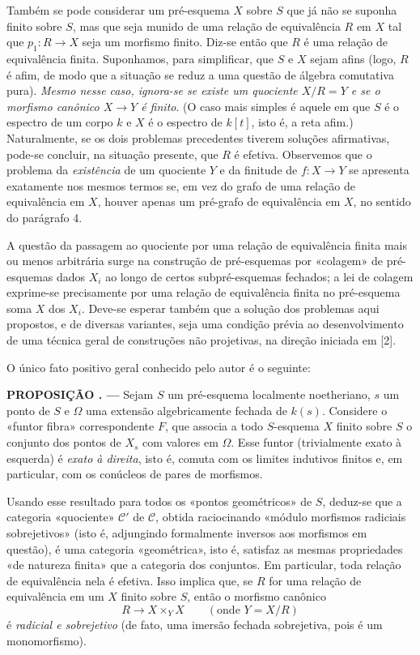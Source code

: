 \documentclass[11pt,twoside,openany]{book}
\numberwithin{equation}{section}
\newcommand{\src}[1]{%
  \phantomsection\hypertarget{src:#1}{}%
  \marginpar{\raggedleft\footnotesize\sffamily #1}%
}
\theoremstyle{plain}
\theoremstyle{definition}
\theoremstyle{remark}
\newcommand{\result}[2]{%
  \par\medskip\noindent\textbf{#1%
  \if\relax\detokenize{#2}\relax\else\space#2\fi. ---}\enspace
}
\newcommand{\FgaUnitKey}{frontmatter}
\renewcommand{\src}[1]{%
  \phantomsection\hypertarget{src:\FgaUnitKey:#1}{}%
  \marginpar{\raggedleft\footnotesize\sffamily #1}%
}
\begin{document}
Também se pode considerar um pré-esquema $X$ sobre $S$ que já não se suponha
finito sobre $S$, mas que seja munido de uma relação de equivalência $R$ em
$X$ tal que $p_1:R\longrightarrow X$ seja um morfismo finito. Diz-se então que
$R$ é uma relação de equivalência finita. Suponhamos, para simplificar, que $S$
e $X$ sejam afins (logo, $R$ é afim, de modo que a situação se reduz a uma
questão de álgebra comutativa pura). \emph{Mesmo nesse caso, ignora-se se
existe um quociente $X/R=Y$ e se o morfismo canônico $X\longrightarrow Y$ é
finito}. (O caso mais simples é aquele em que $S$ é o espectro de um corpo $k$
e $X$ é o espectro de $k[t]$, isto é, a reta afim.) Naturalmente, se os dois
problemas precedentes tiverem soluções afirmativas, pode-se concluir, na
situação presente, que $R$ é efetiva. Observemos que o problema da
\emph{existência} de um quociente $Y$ e da finitude de
$f:X\longrightarrow Y$ se apresenta exatamente nos mesmos termos se, em vez
do grafo de uma relação de equivalência em $X$, houver apenas um pré-grafo de
equivalência em $X$, no sentido do parágrafo 4.

A questão da passagem ao quociente por uma relação de equivalência finita mais
ou menos arbitrária surge na construção de pré-esquemas por «colagem» de
pré-esquemas dados $X_i$ ao longo de certos subpré-esquemas fechados; a lei de
colagem exprime-se precisamente por uma relação de equivalência finita no
pré-esquema soma $X$ dos $X_i$. Deve-se esperar também que a solução dos
problemas aqui propostos, e de diversas variantes, seja uma condição prévia ao
desenvolvimento de uma técnica geral de construções não projetivas, na direção
iniciada em [2].

O único fato positivo geral conhecido pelo autor é o seguinte:

\result{PROPOSIÇÃO}{2.1} Sejam $S$ um pré-esquema localmente noetheriano, $s$
um ponto de $S$ e $\Omega$ uma extensão algebricamente fechada de $k(s)$.
Considere o
\src{104}«funtor fibra» correspondente $F$, que associa a todo $S$-esquema
$X$ finito sobre $S$ o conjunto dos pontos de $X_s$ com valores em $\Omega$.
Esse funtor (trivialmente exato à esquerda) é \emph{exato à direita}, isto é,
comuta com os limites indutivos finitos e, em particular, com os conúcleos de
pares de morfismos.

Usando esse resultado para todos os «pontos geométricos» de $S$, deduz-se que
a categoria «quociente» $\mathcal C'$ de $\mathcal C$, obtida raciocinando
«módulo morfismos radiciais sobrejetivos» (isto é, adjungindo formalmente
inversos aos morfismos em questão), é uma categoria «geométrica», isto é,
satisfaz as mesmas propriedades «de natureza finita» que a categoria dos
conjuntos. Em particular, toda relação de equivalência nela é efetiva. Isso
implica que, se $R$ for uma relação de equivalência em um $X$ finito sobre
$S$, então o morfismo canônico
\[
  R\longrightarrow X\times_Y X\qquad (\text{onde }Y=X/R)
\]
é \emph{radicial e sobrejetivo} (de fato, uma imersão fechada sobrejetiva,
pois é um monomorfismo).
\end{document}
